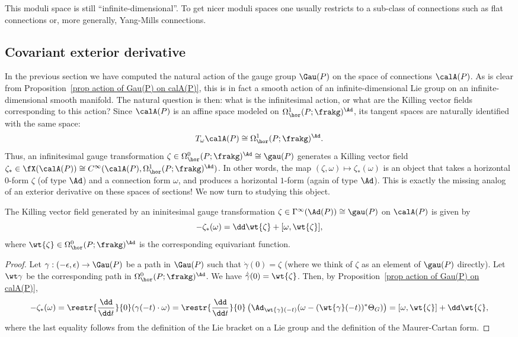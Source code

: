 This moduli space is still ``infinite-dimensional''. To get nicer moduli spaces one usually restricts to a sub-class of connections such as flat connections or, more generally, Yang-Mills connections.







\subsection{Covariant exterior derivative}



In the previous section we have computed the natural action of the gauge group $\Gau(P)$ on the space of connections $\calA(P)$. As is clear from Proposition~\ref{prop action of Gau(P) on calA(P)}, this is in fact a smooth action of an infinite-dimensional Lie group on an infinite-dimensional smooth manifold. The natural question is then: what is the infinitesimal action, or what are the Killing vector fields corresponding to this action? Since $\calA(P)$ is an affine space modeled on $\Omega^1_{\hor}(P;\frakg)^\Ad$, its tangent spaces are naturally identified with the same space:
\[T_\omega\calA(P)\cong \Omega^1_{\hor}(P;\frakg)^\Ad.\]
Thus, an infinitesimal gauge transformation $\zeta\in\Omega^0_{\hor}(P;\frakg)^\Ad\cong\gau(P)$ generates a Killing vector field $\zeta_\ast\in \fX(\calA(P))\cong C^\infty(\calA(P),\Omega^1_{\hor}(P;\frakg)^\Ad)$. In other words, the map $(\zeta,\omega)\mapsto\zeta_\ast(\omega)$ is an object that takes a horizontal $0$-form $\zeta$ (of type $\Ad$) and a connection form $\omega$, and produces a horizontal $1$-form (again of type $\Ad$). This is exactly the missing analog of an exterior derivative on these spaces of sections! We now turn to studying this object.

\begin{prop}
    The Killing vector field generated by an ininitesimal gauge transformation $\zeta\in\Gamma^\infty(\Ad(P))\cong\gau(P)$ on $\calA(P)$ is given by
    \[-\zeta_\ast(\omega)=\dd \wt{\zeta}+[\omega,\wt{\zeta}],\]
    where $\wt{\zeta}\in \Omega^0_{\hor}(P;\frakg)^\Ad$ is the corresponding equivariant function.
\end{prop}
\begin{proof}
    Let $\gamma:(-\epsilon,\epsilon)\to \Gau(P)$ be a path in $\Gau(P)$ such that $\dot\gamma(0)=\zeta$ (where we think of $\zeta$ as an element of $\gau(P)$ directly). Let $\wt\gamma$ be the corresponding path in $\Omega^0_{\hor}(P;\frakg)^\Ad$. We have $\dot{\tilde{\gamma}}(0)=\wt{\zeta}$. Then, by Proposition~\ref{prop action of Gau(P) on calA(P)},
    \[-\zeta_\ast(\omega)=\restr{\frac{\dd}{\dd t}}{0}(\gamma(-t)\cdot \omega)=\restr{\frac{\dd}{\dd t}}{0}\left(\Ad_{\wt{\gamma}(-t)}(\omega-(\wt{\gamma}(-t))^\ast\Theta_G)\right)=[\omega,\wt{\zeta}]+\dd\wt{\zeta},\]
    where the last equality follows from the definition of the Lie bracket on a Lie group and the definition of the Maurer-Cartan form.
\end{proof}


